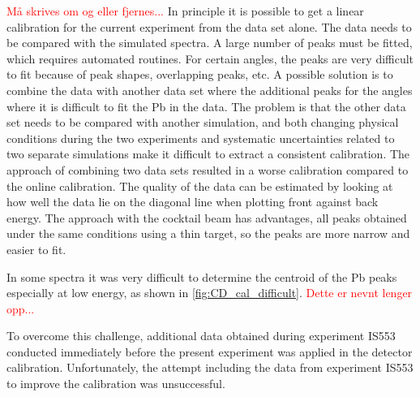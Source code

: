 \documentclass[twoside,english]{uiofysmaster/uiofysmaster}
\let\orgautoref\autoref
\renewcommand{\autoref}
        {%
		 \def\sectionautorefname{Section}%
		 \def\subsectionautorefname{Section}%
		 \def\subsubsectionautorefname{Section}%
		 \def\chapterautorefname{Chapter}%
          \orgautoref}
\begin{document}
\bigskip

\textcolor{red}{Må skrives om og eller fjernes...}\newline
In principle it is possible to get a linear calibration for the current experiment from the data set alone. 
The data needs to be compared with the simulated spectra. 
A large number of peaks must be fitted, which requires automated routines.
For certain angles, the peaks are very difficult to fit because of peak shapes, overlapping peaks, etc. 
A possible solution is to combine the data with another data set where the additional peaks for the angles where it is difficult to fit the Pb in the data. 
The problem is that the other data set needs to be compared with another simulation, and both changing physical conditions during the two experiments and systematic uncertainties related to two separate simulations make it difficult to extract a consistent calibration. 
The approach of combining two data sets resulted in a worse calibration compared to the online calibration. 
The quality of the data can be estimated by looking at how well the data lie on the diagonal line when plotting front against back energy.
The approach with the cocktail beam has advantages, all peaks obtained under the same conditions using a thin target, so the peaks are more narrow and easier to fit. 

\bigskip

In some spectra it was very difficult to determine the centroid of the Pb peaks especially at low energy, as shown in \autoref{fig:CD_cal_difficult}. \textcolor{red}{Dette er nevnt lenger opp...}

To overcome this challenge, additional data obtained during experiment IS553 conducted immediately before the present experiment was applied in the detector calibration.
Unfortunately, the attempt including the data from experiment IS553 to improve the calibration was unsuccessful.
\end{document}
